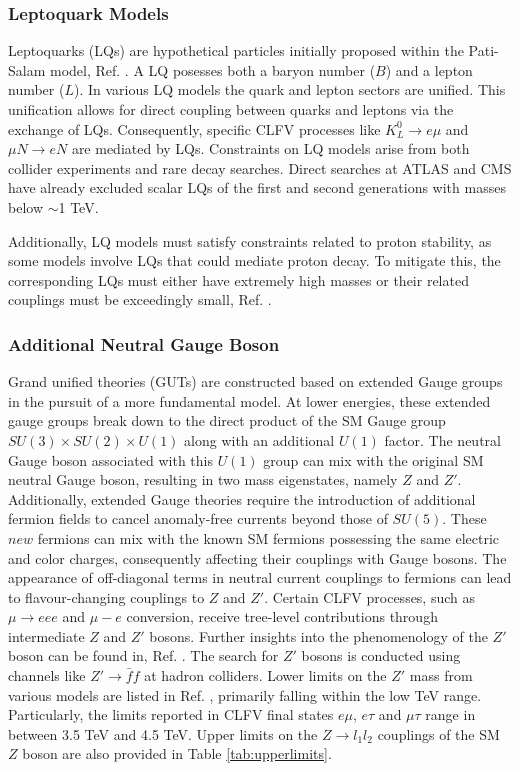 \subsubsection{Leptoquark Models}
Leptoquarks (LQs) are hypothetical particles initially 
proposed within the Pati-Salam model, Ref. \cite{PhysRevD.10.275}. 
A LQ posesses both a baryon number ($B$) and a lepton number ($L$). 
In various LQ models the quark and lepton sectors are unified. This 
unification allows for direct coupling between quarks and leptons via 
the exchange of LQs. Consequently, specific CLFV processes like 
$K_L^0 \rightarrow e \mu$ and $\mu N \rightarrow e N$ are mediated by LQs. 
Constraints on LQ models arise from both collider experiments and rare decay 
searches. Direct searches at ATLAS and CMS have already excluded scalar LQs of the 
first and second generations with masses below $\sim$1 TeV.

Additionally, LQ models must satisfy constraints related to 
proton stability, as some models involve LQs that could mediate 
proton decay. To mitigate this, the corresponding LQs must either 
have extremely high masses or their related couplings must be 
exceedingly small, Ref. \cite{DORSNER20161}.
\subsubsection{Additional Neutral Gauge Boson}
Grand unified theories (GUTs) are constructed based on 
extended Gauge groups in the pursuit of a more fundamental model. 
At lower energies, these extended gauge groups break down to the 
direct product of the SM Gauge group $SU(3) \times SU(2) \times U(1)$ 
along with an additional $U(1)$ factor. The neutral Gauge boson 
associated with this $U(1)$ group can mix with the original SM 
neutral Gauge boson, resulting in two mass eigenstates, namely 
$Z$ and $Z'$. Additionally, extended Gauge theories require the 
introduction of additional fermion fields to cancel anomaly-free 
currents beyond those of $SU(5)$. These $new$ fermions can mix 
with the known SM fermions possessing the same electric and color 
charges, consequently affecting their couplings with Gauge bosons. 
The appearance of off-diagonal terms in neutral current couplings 
to fermions can lead to flavour-changing couplings to $Z$ and $Z'$. 
Certain CLFV processes, such as $\mu \rightarrow eee$ and $\mu-e$ 
conversion, receive tree-level contributions through intermediate 
$Z$ and $Z'$ bosons. Further insights into the phenomenology of the 
$Z'$ boson can be found in, Ref. \cite{Leike_1999}. The search for 
$Z'$ bosons is conducted using channels like $Z' \rightarrow \bar{f}f$ 
at hadron colliders. Lower limits on the $Z'$ mass from various models 
are listed in Ref. \cite{zyla}, primarily falling within the low TeV range. 
Particularly, the limits reported in CLFV final states $e\mu$, $e\tau$ 
and $\mu\tau$ range in between 3.5 TeV and 4.5 TeV. Upper limits on the 
$Z \rightarrow l_1 l_2$ couplings of the SM $Z$ boson are also provided 
in Table \ref{tab:upperlimits}.

